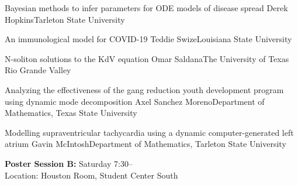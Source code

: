 \begin{postersPU}
\item\poster %
{Bayesian methods to infer parameters for ODE models of disease spread}
{Derek Hopkins}{Tarleton State University}

\item\poster %
{An immunological model for COVID-19}
{Teddie Swize}{Louisiana State University}
\item\poster %
{N-soliton solutions to the KdV equation}
{Omar Saldana}{The University of Texas Rio Grande Valley}

\item\poster %
{Analyzing the effectiveness of the gang reduction youth development program using dynamic mode decomposition}
{Axel Sanchez Moreno}{Department of Mathematics, Texas State University}

\item\poster %
{Modelling supraventricular tachycardia using a dynamic computer-generated left atrium}
{Gavin McIntosh}{Department of Mathematics, Tarleton State University}


\end{postersPU}


\newpage
\begin{center}
{\large {\bf Poster Session B:} Saturday 7:30--\\
Location: Houston Room, Student Center South}
\end{center}


